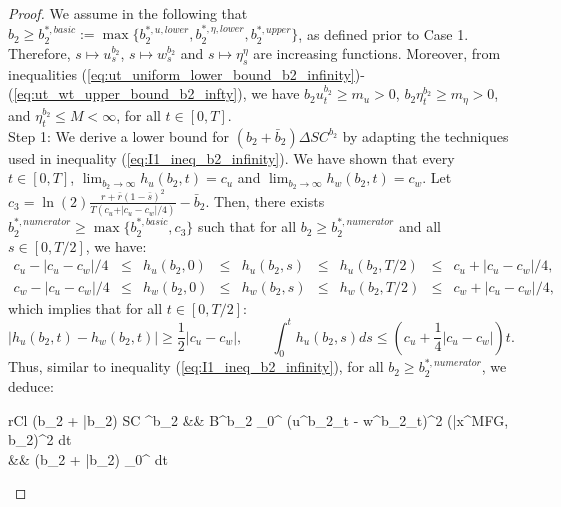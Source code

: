 \documentclass[11pt]{article}
\begin{document}
\begin{proof}
	We assume in the following that $b_2 \geq b_2^{*,basic} := \max \{b_2^{*,u,lower}, b_2^{*,\eta,lower}, b_2^{*,upper} \}$, as defined prior to Case 1. Therefore, $s \mapsto u_s^{b_2}$, $s \mapsto w_s^{b_2}$ and $s \mapsto \eta_s^{\eta}$ are increasing functions. Moreover, from inequalities (\ref{eq:ut_uniform_lower_bound_b2_infinity})-(\ref{eq:ut_wt_upper_bound_b2_infty}), we have $b_2 u_t^{b_2} \geq m_u>0$, $b_2 \eta_t^{b_2} \geq m_\eta>0$, and $\eta_t^{b_2} \leq M<\infty$, for all $t\in[0,T]$.\\
	
	Step 1: We derive a lower bound for $(b_2+\bar{b}_2)\Delta SC^{b_2}$ by adapting the techniques used in inequality (\ref{eq:I1_ineq_b2_infinity}).  We have shown that every $t \in[0,T]$,  $\lim_{b_2 \to \infty} h_u(b_2, t)= c_u$ and $\lim_{b_2 \to \infty} h_w(b_2, t)= c_w$. Let $c_3 = \ln(2) \frac{r + \bar{r}(1-\bar{s})^2}{T (c_u + \vert c_u - c_w \vert / 4)} - \bar{b}_2$. Then, there exists $b_2^{*,numerator} \geq \max \{ b_2^{*,basic}, c_3 \}$ such that for all $b_2 \geq b_2^{*,numerator}$ and all $s \in [0, T/2]$, we have:
	\begin{equation*}
	\begin{array}{lclclclcl}
		c_u - \left\vert c_u - c_w  \right\vert /4 &\leq& h_u(b_2, 0) &\leq& h_u(b_2,s) &\leq& h_u(b_2, T/2) &\leq& c_u + \left\vert c_u - c_w \right\vert /4, \\
		c_w -  \left\vert c_u - c_w  \right\vert /4 &\leq& h_w(b_2, 0) &\leq& h_w(b_2,s) &\leq& h_w(b_2, T/2) &\leq& c_w + \left\vert c_u - c_w  \right\vert /4,
	\end{array}
	\end{equation*}
	which implies that for all $t \in [0,T/2]$:
	$$ \left\vert h_u(b_2, t) - h_w(b_2,t)\right\vert \geq \frac{1}{2} \left\vert c_u - c_w \right\vert, \qquad \int_0^t h_u(b_2, s) ds \leq \left( c_u + \frac{1}{4} \left\vert c_u - c_w \right\vert \right) t.
	$$
	Thus, similar to inequality (\ref{eq:I1_ineq_b2_infinity}), for all $b_2 \geq b_2^{*,numerator}$, we deduce:
	\begin{IEEEeqnarray}{rCl}
		(b_2 + \bar{b}_2) \Delta SC ^{b_2} &\geq &  B^{b_2} \int_0^{} (u^{b_2}_t - w^{b_2}_t)^2 (\bar{x}^{MFG, b_2})^2 dt \nonumber \\
		&\geq&  \cdot (b_2 + \bar{b}_2) \int_0^{} \exp {} dt \nonumber \\

\end{IEEEeqnarray}
\end{proof}
\end{document}

